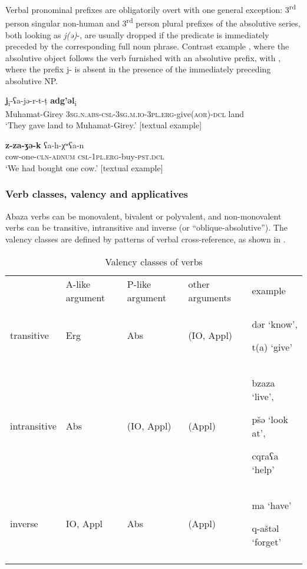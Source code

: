 \documentclass[output=paper]{langscibook}
\begin{document}
Verbal pronominal prefixes are obligatorily overt with one general exception: 3\textsuperscript{rd} person singular non-human and 3\textsuperscript{rd} person plural prefixes of the absolutive series, both looking as \textit{j({ə})}{}-, are usually dropped if the predicate is immediately preceded by the corresponding full noun phrase. Contrast example , where the absolutive object follows the verb furnished with an absolutive prefix, with , where the prefix {j}{}- is absent in the presence of the immediately preceding absolutive NP.


\ea 
\label{ex:Arkadiev:8}
    \ea 
    \label{ex:Arkadiev:8a}
     \textbf{{j}}\textsubscript{i}{{}-{ʕ}a-j{ə}-r-t-t{̣}} \textbf{{adg’{ə}l}}\textsubscript{i}\\
     Muhamat-Girey  \textsc{3sg.n.abs-csl-3sg.m.io-3pl.erg-}give(\textsc{aor)-dcl}  land\\
    \glt ‘They gave land to Muhamat-Girey.’ [textual example]
    
    \ex 
    \label{ex:Arkadiev:8b}
    \gll  \textbf{z-za-{ʒ}{ə}{}-k} ʕa-h-χʷʕa-n\\
    cow-one-\textsc{cln-adnum}  \textsc{csl-1pl.erg}-buy-\textsc{pst.dcl}\\
    \glt ‘We had bought one cow.’ [textual example]
    \z
    
\z

\subsubsection{Verb classes, valency and applicatives}\label{sec:Arkadiev:1.2.4}



Abaza verbs can be monovalent, bivalent or polyvalent, and non-monovalent verbs can be transitive, intransitive and inverse %
%
(or “oblique-absolutive”). The valency classes are defined by patterns of verbal cross-reference, as shown in .



\begin{table}
\begin{tabularx}{\textwidth}{XXXXX} & A-like argument & P-like argument & other arguments & example\\
\lsptoprule
transitive & Erg & Abs & (IO, Appl) & {d{ə}r} ‘know’, 

{t(a)} ‘give’\\
intransitive & Abs & (IO, Appl) & (Appl) & {bzaza} ‘live’, 

{pš{ə}} ‘look at’, 

{cqra{ʕ}a} ‘help’\\

inverse & IO, Appl & Abs & (Appl) & {ma} ‘have’

{q-ašt{ə}l} ‘forget’\\
\lspbottomrule
\end{tabularx}
\caption{Valency classes of verbs}
\label{tab:Arkadiev:4}

\end{table}
\end{document}
